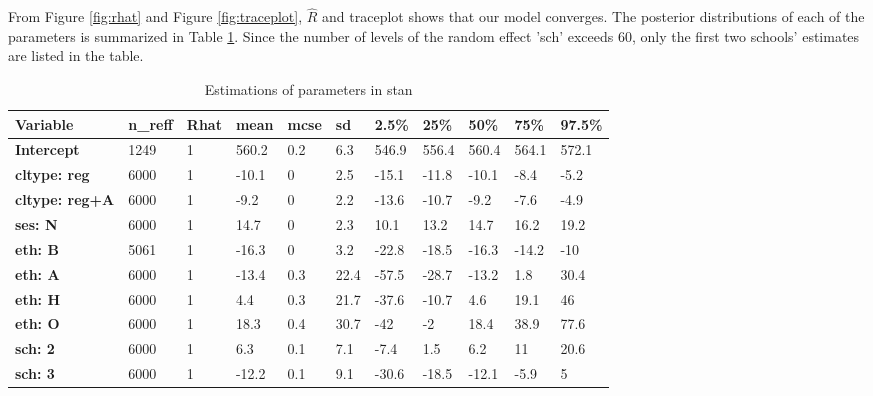 \documentclass[11pt,a4paper]{article}
\begin{document}
From Figure \ref{fig:rhat} and Figure \ref{fig:traceplot}, $\hat{R}$ and traceplot shows that our model converges. The posterior distributions of each of the parameters
is summarized in Table \ref{tab:estimation}. Since the number of levels of the random effect 'sch' exceeds 60, 
only the first two schools' estimates are listed in the table.\\

\begin{table}[h]
    \centering
    \caption{Estimations of parameters in stan}
    \label{tab:estimation}
    \begin{tabular}{|l|l|l|l|l|l|l|l|l|l|l|}
    \hline
    \textbf{Variable}      & \textbf{n\_reff} & \textbf{Rhat} & \textbf{mean}  & \textbf{mcse} & \textbf{sd}   & \textbf{2.5\%} & \textbf{25\%}  & \textbf{50\%}  & \textbf{75\%}  & \textbf{97.5\%} \\ \hline
    \textbf{Intercept}     & 1249    & 1    & 560.2          & 0.2  & 6.3  & 546.9 & 556.4 & 560.4 & 564.1 & 572.1  \\ \hline
    \textbf{cltype: reg}   & 6000    & 1    & -10.1          & 0    & 2.5  & -15.1 & -11.8 & -10.1 & -8.4  & -5.2   \\ \hline
    \textbf{cltype: reg+A} & 6000    & 1    & -9.2           & 0    & 2.2  & -13.6 & -10.7 & -9.2  & -7.6  & -4.9   \\ \hline
    \textbf{ses: N}        & 6000    & 1    & 14.7           & 0    & 2.3  & 10.1  & 13.2  & 14.7  & 16.2  & 19.2   \\ \hline
    \textbf{eth: B}        & 5061    & 1    & -16.3          & 0    & 3.2  & -22.8 & -18.5 & -16.3 & -14.2 & -10    \\ \hline
    \textbf{eth: A}        & 6000    & 1    & -13.4          & 0.3  & 22.4 & -57.5 & -28.7 & -13.2 & 1.8   & 30.4   \\ \hline
    \textbf{eth: H}        & 6000    & 1    & 4.4            & 0.3  & 21.7 & -37.6 & -10.7 & 4.6   & 19.1  & 46     \\ \hline
    \textbf{eth: O}        & 6000    & 1    & 18.3           & 0.4  & 30.7 & -42   & -2    & 18.4  & 38.9  & 77.6   \\ \hline
    \textbf{sch: 2}        & 6000    & 1    & 6.3            & 0.1  & 7.1  & -7.4  & 1.5   & 6.2   & 11    & 20.6   \\ \hline
    \textbf{sch: 3}        & 6000    & 1    & -12.2          & 0.1  & 9.1  & -30.6 & -18.5 & -12.1 & -5.9  & 5      \\ \hline
    \end{tabular}
\end{table}
\end{document}
